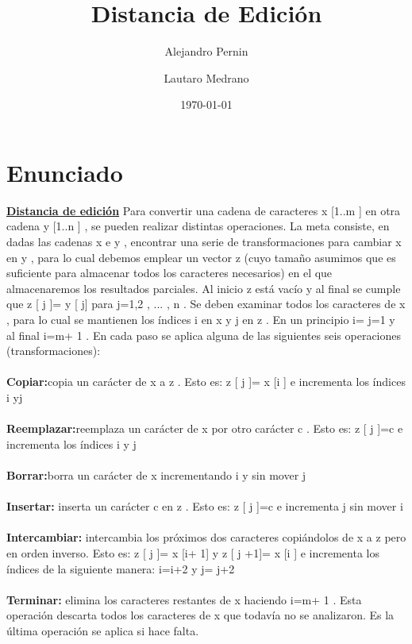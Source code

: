 \documentclass[12pt]{article}
\title{Distancia de Edición}
\author{
        Alejandro Pernin \\
                \and
        Lautaro Medrano\\
}
\date{\today}
\begin{document}


\maketitle

\newpage
\tableofcontents

\newpage

\section{Enunciado}
\textbf{\underline{Distancia de edición}}
Para convertir una cadena de caracteres x [1..m ] en otra cadena y [1..n ] , se pueden
realizar distintas operaciones. La meta consiste, en dadas las cadenas x e y ,
encontrar una serie de transformaciones para cambiar x en y , para lo cual debemos
emplear un vector z (cuyo tamaño asumimos que es suficiente para almacenar todos los
caracteres necesarios) en el que almacenaremos los resultados parciales. Al inicio z
está vacío y al final se cumple que z [ j ]= y [ j] para j=1,2 , ... , n . Se deben examinar
todos los caracteres de x , para lo cual se mantienen los índices i en x y j en z .
En un principio i= j=1 y al final i=m+ 1 . En cada paso se aplica alguna de las
siguientes seis operaciones (transformaciones):
\\\\
\textbf{Copiar:}copia un carácter de x a z . Esto es: z [ j ]= x [i ] e incrementa los índices i
yj
\\\\
\textbf{Reemplazar:}reemplaza un carácter de x por otro carácter c . Esto es: z [ j ]=c e
incrementa los índices i y j
\\\\
\textbf{Borrar:}borra un carácter de x incrementando i y sin mover j
\\\\
\textbf{Insertar:} inserta un carácter c en z . Esto es: z [ j ]=c e incrementa j sin mover i
\\\\
\textbf{Intercambiar:} intercambia los próximos dos caracteres copiándolos de x a z pero en
orden inverso. Esto es: z [ j ]= x [i+ 1] y z [ j +1]= x [i ] e incrementa los índices de la
siguiente manera: i=i+2 y j= j+2
\\\\
\textbf{Terminar:} elimina los caracteres restantes de x haciendo i=m+ 1 . Esta operación
descarta todos los caracteres de x que todavía no se analizaron. Es la última operación
se aplica si hace falta.
\end{document}
